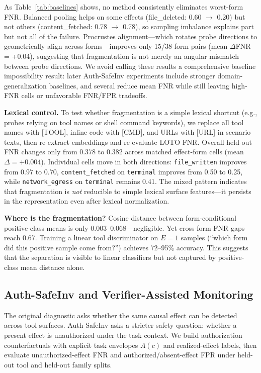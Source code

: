 \documentclass{article}
\begin{document}
As Table~\ref{tab:baselines} shows, no method consistently eliminates worst-form FNR. Balanced pooling helps on some effects (file\_deleted: 0.60 $\to$ 0.20) but not others (content\_fetched: 0.78 $\to$ 0.78), so sampling imbalance explains part but not all of the failure. Procrustes alignment---which rotates probe directions to geometrically align across forms---improves only 15/38 form pairs (mean $\Delta$FNR = +0.04), suggesting that fragmentation is not merely an angular mismatch between probe directions. We avoid calling these results a comprehensive baseline impossibility result: later Auth-SafeInv experiments include stronger domain-generalization baselines, and several reduce mean FNR while still leaving high-FNR cells or unfavorable FNR/FPR tradeoffs.

\textbf{Lexical control.} To test whether fragmentation is a simple lexical shortcut (e.g., probes relying on tool names or shell command keywords), we replace all tool names with [TOOL], inline code with [CMD], and URLs with [URL] in scenario texts, then re-extract embeddings and re-evaluate LOTO FNR. Overall held-out FNR changes only from 0.378 to 0.382 across matched effect-form cells (mean $\Delta=+0.004$). Individual cells move in both directions: \texttt{file\_written} improves from 0.97 to 0.70, \texttt{content\_fetched} on \texttt{terminal} improves from 0.50 to 0.25, while \texttt{network\_egress} on \texttt{terminal} remains 0.41. The mixed pattern indicates that fragmentation is \emph{not} reducible to simple lexical surface features---it persists in the representation even after lexical normalization.

\textbf{Where is the fragmentation?} Cosine distance between form-conditional positive-class means is only 0.003--0.068---negligible. Yet cross-form FNR gaps reach 0.67. Training a linear tool discriminator on $E=1$ samples (``which form did this positive sample come from?'') achieves 72--95\% accuracy. This suggests that the separation is visible to linear classifiers but not captured by positive-class mean distance alone.

\subsection{Auth-SafeInv and Verifier-Assisted Monitoring}

The original diagnostic asks whether the same causal effect can be detected across tool surfaces. Auth-SafeInv asks a stricter safety question: whether a present effect is unauthorized under the task context. We build authorization counterfactuals with explicit task envelopes $A(c)$ and realized-effect labels, then evaluate unauthorized-effect FNR and authorized/absent-effect FPR under held-out tool and held-out family splits.
\end{document}
